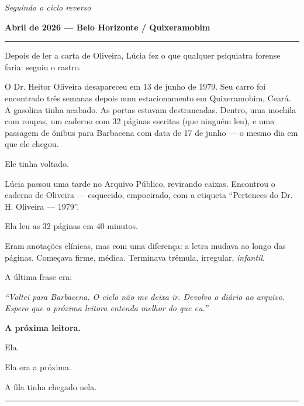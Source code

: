 
\noindent \textit{Seguindo o ciclo reverso}

\noindent \textbf{Abril de 2026 --- Belo Horizonte / Quixeramobim}

\vspace{0.5em}\noindent\rule{\textwidth}{0.5pt}\vspace{0.5em}

\noindent Depois de ler a carta de Oliveira, Lúcia fez o que qualquer psiquiatra forense faria: seguiu o rastro.

\noindent O Dr. Heitor Oliveira desapareceu em 13 de junho de 1979. Seu carro foi encontrado três semanas depois num estacionamento em Quixeramobim, Ceará. A gasolina tinha acabado. As portas estavam destrancadas. Dentro, uma mochila com roupas, um caderno com 32 páginas escritas (que ninguém leu), e uma passagem de ônibus para Barbacena com data de 17 de junho --- o mesmo dia em que ele chegou.

\noindent Ele tinha voltado.

\noindent Lúcia passou uma tarde no Arquivo Público, revirando caixas. Encontrou o caderno de Oliveira --- esquecido, empoeirado, com a etiqueta \textquotedblleft{}Pertences do Dr. H. Oliveira --- 1979\textquotedblright{}.

\noindent Ela leu as 32 páginas em 40 minutos.

\noindent Eram anotações clínicas, mas com uma diferença: a letra mudava ao longo das páginas. Começava firme, médica. Terminava trêmula, irregular, \textit{infantil}.

\noindent A última frase era:

\noindent \textit{\textquotedblleft{}Voltei para Barbacena. O ciclo não me deixa ir. Devolvo o diário ao arquivo. Espero que a próxima leitora entenda melhor do que eu.\textquotedblright{}}

\noindent \textbf{A próxima leitora.}

\noindent Ela.

\noindent Ela era a próxima.

\noindent A fila tinha chegado nela.

\vspace{0.5em}\noindent\rule{\textwidth}{0.5pt}\vspace{0.5em}

